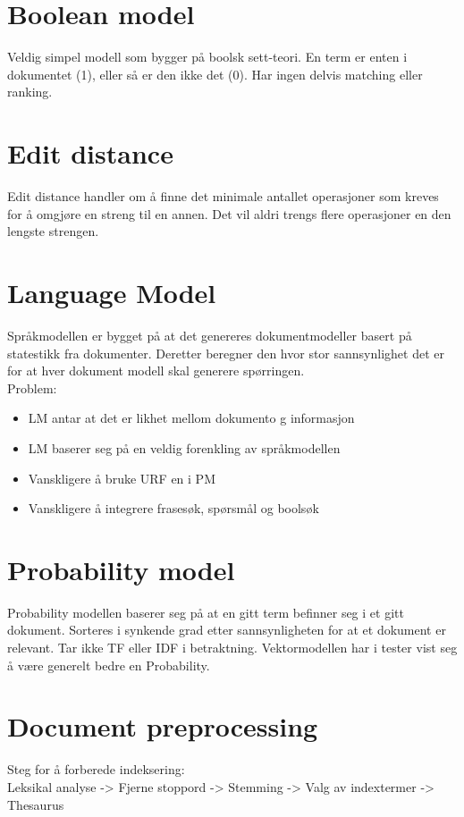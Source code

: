 \documentclass[a4paper, 10pt]{article}
\begin{document}
\section{Boolean model}
Veldig simpel modell som bygger på boolsk sett-teori. En term er enten i dokumentet (1), eller så er den ikke det (0). Har ingen delvis matching eller ranking.

\section{Edit distance}
Edit distance handler om å finne det minimale antallet operasjoner som kreves for å omgjøre en streng til en annen. Det vil aldri trengs flere operasjoner en den lengste strengen. 

\section{Language Model}
Språkmodellen er bygget på at det genereres dokumentmodeller basert på statestikk fra dokumenter. Deretter beregner den hvor stor sannsynlighet det er for at hver dokument modell skal generere spørringen.\\
Problem:
\begin{itemize}
	\item LM antar at det er likhet mellom dokumento g informasjon
	\item LM baserer seg på en veldig forenkling av språkmodellen
	\item Vanskligere å bruke URF en i PM
	\item Vanskligere å integrere frasesøk, spørsmål og boolsøk
\end{itemize}

\section{Probability model}
Probability modellen baserer seg på at en gitt term befinner seg i et gitt dokument. Sorteres i synkende grad etter sannsynligheten for at et dokument er relevant. Tar ikke TF eller IDF i betraktning. Vektormodellen har i tester vist seg å være generelt bedre en Probability.

\section{Document preprocessing}
Steg for å forberede indeksering:\\
Leksikal analyse -> Fjerne stoppord -> Stemming -> Valg av indextermer -> Thesaurus
\end{document}

